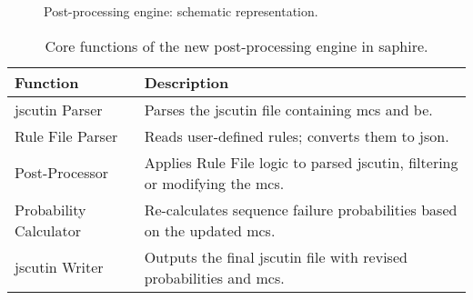 \begin{figure}[h]
  \centering
  \caption{Post-processing engine: schematic representation.}
  \label{fig:postproc-engine-schematic}
\end{figure}

\begin{table}[h]
\centering 
\caption{Core functions of the new post-processing engine in \acrshort{saphire}.}
\begin{tabular}{@{}ll@{}}
\toprule
\textbf{Function}                  & \textbf{Description}                                                                                             \\ 
\midrule
\acrshort{jscutin} Parser                & Parses the \acrshort{jscutin} file containing \acrshort{mcs} and \acrlong{be}.                                  \\
Rule File Parser                   & Reads user-defined rules; converts them to \acrshort{json}.                              \\
Post-Processor                     & Applies Rule File logic to parsed \acrshort{jscutin}, filtering or modifying the \acrshort{mcs}.                   \\
Probability Calculator             & Re-calculates sequence failure probabilities based on the updated \acrshort{mcs}.                                     \\
\acrshort{jscutin} Writer                     & Outputs the final \acrshort{jscutin} file with revised probabilities and \acrshort{mcs}.                                \\ 
\bottomrule
\end{tabular}
\label{tab:coreFunctions}
\end{table}

